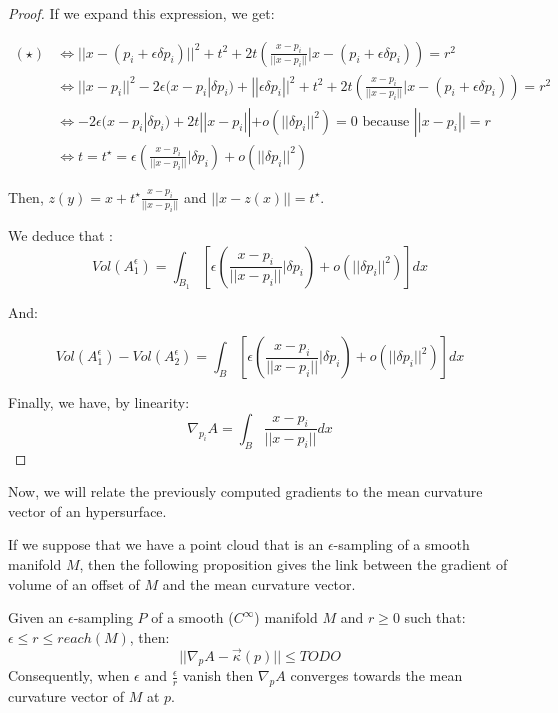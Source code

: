 \begin{proof}
If we expand this expression, we get:

\begin{align*}
    (\star) & \iff || x - (p_i + \epsilon \delta p_i) ||^2 + t^2 + 2t \left(
        \frac{x-p_i}{|| x - p_i||} | x - (p_i + \epsilon \delta p_i) \right) = r^2 \\
    & \iff || x - p_i || ^2 - 2 \epsilon (x - p_i | \delta p_i) + || \epsilon \delta p_i || ^2 + t^2 + 2t
    \left( \frac{x-p_i}{|| x - p_i||} | x - (p_i + \epsilon \delta p_i) \right) = r^2 \\
    & \iff -2 \epsilon (x - p_i | \delta p_i) + 2t || x - p_i|| + o(||\delta p_i||^2) = 0
    \text{ because } || x - p_i || = r \\
    & \iff t = t^{\star} = \epsilon \left( \frac{x - p_i}{||x - p_i||} | \delta p_i \right) +
    o(||\delta p_i||^2)
\end{align*}

Then, $ z(y) = x + t^{\star} \frac{x - p_i}{||x - p_i||} $ and $ || x - z(x) || =
t^{\star} $.

We deduce that :
$$ Vol(A_1^\epsilon) = \int_{B_1} \left[ \epsilon \left( \frac{x - p_i}{||x - p_i||} | \delta p_i \right) +
o(||\delta p_i||^2) \right] dx $$

And:

$$ Vol(A_1^\epsilon) - Vol(A_2^\epsilon) = \int_{B} \left[ \epsilon \left( \frac{x - p_i}{||x - p_i||} | \delta p_i \right)
+ o(||\delta p_i||^2) \right] dx $$

Finally, we have, by linearity:
$$ \nabla_{p_i} A = \int_{B} \frac{x - p_i}{||x - p_i||} dx $$

\end{proof}

Now, we will relate the previously computed gradients to the mean curvature
vector of an hypersurface.

If we suppose that we have a point cloud that is an $\epsilon$-sampling of
a smooth manifold $ M $, then the following proposition gives the link between
the gradient of volume of an offset of $ M $ and the mean curvature vector.

\begin{proposition}
    \label{prop:gradient-mean-curvature}
    Given an $\epsilon$-sampling $ P $ of a smooth ($ C^{\infty} $) manifold $ M $ and $ r \ge 0 $ such
    that: $ \epsilon \leq r \leq reach(M) $, then:
    $$ || \nabla_p A - \vec{\kappa}(p) || \leq TODO $$
    Consequently, when $ \epsilon $ and $ \frac{\epsilon}{r} $ vanish then
    $ \nabla_p A $ converges towards the mean curvature vector of $ M $ at $ p $.
\end{proposition}

